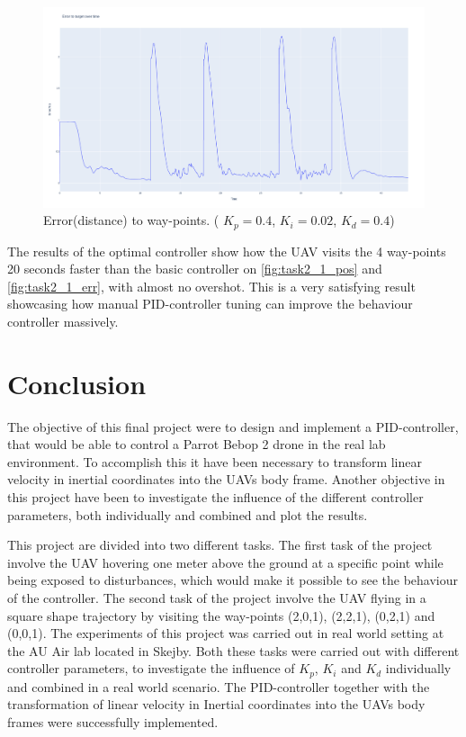 \documentclass[conference]{IEEEtran}
\begin{document}
\begin{figure}[hbtp]
	\centering
	\includegraphics[width=1.0\linewidth]{images/task2_6_err.png}
	\caption{Error(distance) to way-points. ( $K_p = 0.4$, $K_i = 0.02$, $K_d = 0.4$)}
	\label{fig:task2_6_err}
\end{figure}

The results of the optimal controller show how the UAV visits the 4 way-points 20 seconds faster than the basic controller on \cref{fig:task2_1_pos} and \cref{fig:task2_1_err}, with almost no overshot. This is a very satisfying result showcasing how manual PID-controller tuning can improve the behaviour controller massively.

\section{Conclusion}
The objective of this final project were to design and implement a PID-controller, that would be able to control a Parrot Bebop 2 drone in the real lab environment. To accomplish this it have been necessary to transform linear velocity in inertial coordinates into the UAVs body frame. Another objective in this project have been to investigate the influence of the different controller parameters, both individually and combined and plot the results. 

This project are divided into two different tasks. The first task of the project involve the UAV hovering one meter above the ground at a specific point while being exposed to disturbances, which would make it possible to see the behaviour of the controller. The second task of the project involve the UAV flying in a square shape trajectory by visiting the way-points (2,0,1), (2,2,1), (0,2,1) and (0,0,1). The experiments of this project was carried out in real world setting at the AU Air lab located in Skejby. Both these tasks were carried out with different controller parameters, to investigate the influence of $K_p$, $K_i$ and $K_d$ individually and combined in a real world scenario. The PID-controller together with the transformation of linear velocity in Inertial coordinates into the UAVs body frames were successfully implemented.
\end{document}
